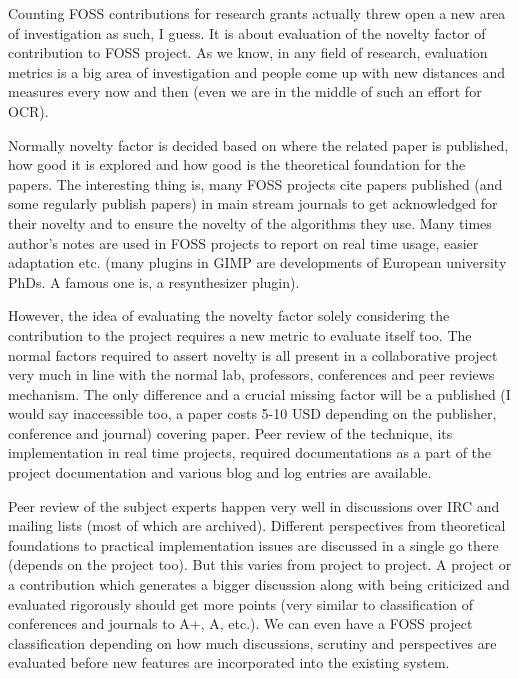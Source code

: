 \vskip 2pt
{\engtext
Counting FOSS contributions for research grants actually threw open
a new area of investigation as such, I guess. It is about evaluation of the novelty
factor of contribution to FOSS project. As we know, in any field of research,
evaluation metrics is a big area of investigation and people come up with new
distances and measures every now and then (even we are in the middle of
such an effort for OCR). 

Normally novelty factor is decided based on where
the related paper is published, how good it is explored and how good is the
theoretical foundation for the papers. The interesting thing is, many FOSS
projects cite papers published (and some regularly publish papers) in main
stream journals to get acknowledged for their novelty and to ensure the novelty of
the algorithms they use. Many times author's notes are used in FOSS projects to
report on real time usage, easier adaptation etc. (many plugins in GIMP are
developments of European university PhDs. A famous one is, a resynthesizer plugin).

However, the idea of evaluating the novelty factor solely considering the contribution
to the project requires a new metric to evaluate itself too. The normal factors
required to assert novelty is all present in a collaborative project very
much in line with the normal lab, professors, conferences and peer reviews mechanism.
The only difference and a crucial missing factor will be a published (I would
say inaccessible too, a paper costs 5-10 USD depending on the publisher,
conference and journal) covering paper. Peer review of the technique,
its implementation in real time projects, required documentations as a
part of the project documentation and various blog and log entries are
available.

Peer review of the subject experts happen very well in discussions
over IRC and mailing lists (most of which are archived). Different perspectives
from theoretical foundations to practical implementation issues are discussed
in a single go there (depends on the project too). But this varies from project
to project. A project or a contribution which generates a bigger discussion
along with being criticized and evaluated rigorously should get more points (very similar
to classification of conferences and journals to A+, A, etc.).  We can even
have a FOSS project classification depending on how much discussions, scrutiny
and perspectives are evaluated before new features are incorporated into the
existing system.

}
